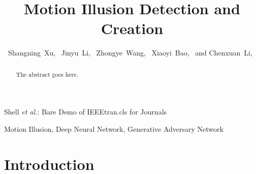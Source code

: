 \documentclass[journal]{IEEEtran}
\begin{document}
%
\title{Motion Illusion Detection and Creation}
%
%
%

\author{
  Shangning~Xu,~
  Jinyu~Li,~
  Zhongye~Wang,~
  Xiaoyi~Bao,~
  and Chenxuan~Li,~
}

%
{Shell \MakeLowercase{\textit{et al.}}: Bare Demo of IEEEtran.cls for Journals}
%


\maketitle

\begin{abstract}
The abstract goes here.
\end{abstract}

\begin{IEEEkeywords}
Motion Illusion, Deep Neural Network, Generative Adversary Network
\end{IEEEkeywords}


\IEEEpeerreviewmaketitle


\section{Introduction}
\label{sec:intro}
\end{document}
